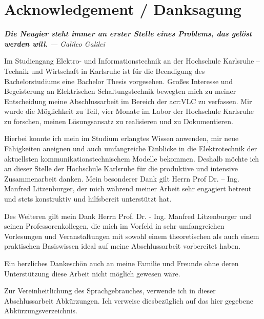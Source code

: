 \chapter*{Acknowledgement / Danksagung}

\textit{\textbf{Die Neugier steht immer an erster Stelle eines Problems, das gelöst
		werden will.}}
\textit{— Galileo Galilei}


Im Studiengang Elektro- und Informationstechnik an der Hochschule Karlsruhe – Technik und Wirtschaft in Karlsruhe ist für die Beendigung des Bachelorstudiums eine Bachelor Thesis vorgesehen. Großes Interesse und Begeisterung an Elektrischen Schaltungstechnik bewegten mich zu meiner Entscheidung meine Abschlussarbeit im Bereich der \gls{acr:VLC} zu verfassen. Mir wurde die Möglichkeit zu Teil, vier Monate im Labor der Hochschule Karlsruhe zu forschen, meinen Lösungsansatz zu realisieren und zu Dokumentieren.

Hierbei konnte ich mein im Studium erlangtes Wissen anwenden, mir neue Fähigkeiten aneignen und auch umfangreiche Einblicke in die Elektrotechnik der aktuellsten kommunikationstechnischem Modelle bekommen. Deshalb möchte ich an dieser Stelle der Hochschule Karlsruhe für die produktive und intensive Zusammenarbeit danken. Mein besonderer Dank gilt Herrn Prof Dr. – Ing. Manfred Litzenburger, der mich während meiner Arbeit sehr engagiert betreut und stets konstruktiv und hilfsbereit unterstützt hat.

Des Weiteren gilt mein Dank Herrn Prof. Dr. - Ing. Manfred Litzenburger und seinen Professorenkollegen, die mich im Vorfeld in sehr umfangreichen Vorlesungen und Veranstaltungen mit sowohl einem theoretischen als auch einem praktischen Basiswissen ideal auf meine Abschlussarbeit vorbereitet haben.

Ein herzliches Dankeschön auch an meine Familie und Freunde ohne deren Unterstützung
diese Arbeit nicht möglich gewesen wäre.

Zur Vereinheitlichung des Sprachgebrauches, verwende ich in dieser Abschlussarbeit Abkürzungen. Ich verweise diesbezüglich auf das hier gegebene Abkürzungsverzeichnis.
